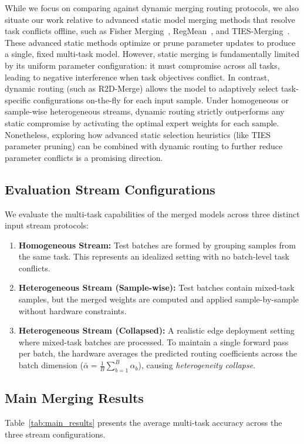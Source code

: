 While we focus on comparing against dynamic merging routing protocols, we also situate our work relative to advanced static model merging methods that resolve task conflicts offline, such as Fisher Merging~\cite{fishermerging}, RegMean~\cite{regmean}, and TIES-Merging~\cite{yadav2023ties}. These advanced static methods optimize or prune parameter updates to produce a single, fixed multi-task model. However, static merging is fundamentally limited by its uniform parameter configuration: it must compromise across all tasks, leading to negative interference when task objectives conflict. In contrast, dynamic routing (such as R2D-Merge) allows the model to adaptively select task-specific configurations on-the-fly for each input sample. Under homogeneous or sample-wise heterogeneous streams, dynamic routing strictly outperforms any static compromise by activating the optimal expert weights for each sample. Nonetheless, exploring how advanced static selection heuristics (like TIES parameter pruning) can be combined with dynamic routing to further reduce parameter conflicts is a promising direction.

\subsection{Evaluation Stream Configurations}
We evaluate the multi-task capabilities of the merged models across three distinct input stream protocols:
\begin{enumerate}
    \item \textbf{Homogeneous Stream:} Test batches are formed by grouping samples from the same task. This represents an idealized setting with no batch-level task conflicts.
    \item \textbf{Heterogeneous Stream (Sample-wise):} Test batches contain mixed-task samples, but the merged weights are computed and applied sample-by-sample without hardware constraints.
    \item \textbf{Heterogeneous Stream (Collapsed):} A realistic edge deployment setting where mixed-task batches are processed. To maintain a single forward pass per batch, the hardware averages the predicted routing coefficients across the batch dimension ($\bar{\alpha} = \frac{1}{B} \sum_{b=1}^B \alpha_b$), causing \emph{heterogeneity collapse}.
\end{enumerate}

\subsection{Main Merging Results}
Table~\ref{tab:main_results} presents the average multi-task accuracy across the three stream configurations.

